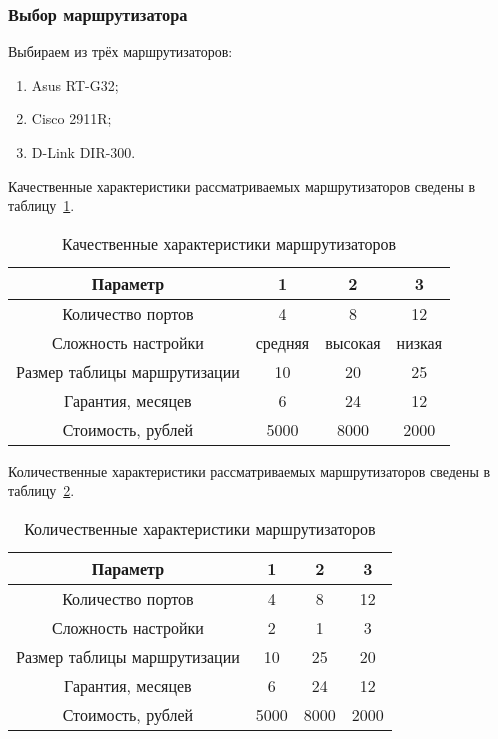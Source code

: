 \subsubsection{Выбор маршрутизатора}

Выбираем из трёх маршрутизаторов:
\begin{enumerate}
\item Asus RT-G32;
\item Cisco 2911R;
\item D-Link DIR-300.
\end{enumerate}

Качественные характеристики рассматриваемых маршрутизаторов сведены в таблицу~\ref{table:router_compare_qual}.

\begin{table}[h]
\caption{Качественные характеристики маршрутизаторов}
\label{table:router_compare_qual}
\centering
  \begin{tabular}{|c|c|c|c|}
  \hline Параметр & 1 & 2 & 3 \\
  \hline Количество портов & 4 & 8 & 12 \\
  \hline Сложность настройки & средняя & высокая & низкая \\
  \hline Размер таблицы маршрутизации & 10 & 20 & 25 \\
  \hline Гарантия, месяцев & 6 & 24 & 12 \\
  \hline Стоимость, рублей & 5000 & 8000 & 2000 \\
  \hline
  \end{tabular}
\end{table}

Количественные характеристики рассматриваемых маршрутизаторов сведены в таблицу~\ref{table:router_compare_numb}.

\begin{table}[h]
\caption{Количественные характеристики маршрутизаторов}
\label{table:router_compare_numb}
\centering
  \begin{tabular}{|c|c|c|c|}
  \hline Параметр & 1 & 2 & 3 \\
  \hline Количество портов & 4 & 8 & 12 \\
  \hline Сложность настройки & 2 & 1 & 3 \\
  \hline Размер таблицы маршрутизации & 10 & 25 & 20 \\
  \hline Гарантия, месяцев & 6 & 24 & 12 \\
  \hline Стоимость, рублей & 5000 & 8000 & 2000 \\
  \hline
  \end{tabular}
\end{table}

